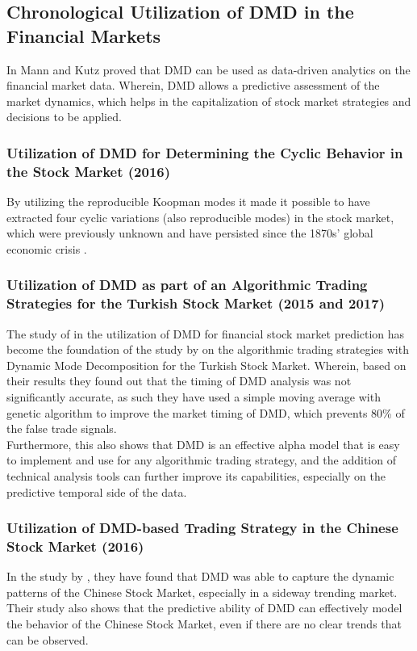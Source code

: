 \subsection{Chronological Utilization of DMD in the Financial Markets}
\label{subsec:chronological_utilization_dmd}
In \citeyear{Mann2015} Mann and Kutz proved that DMD can be used as data-driven analytics 
on the financial market data. Wherein, DMD allows a predictive assessment of 
the market dynamics, which helps in the capitalization of stock market 
strategies and decisions to be applied.

\subsubsection{Utilization of DMD for Determining the Cyclic Behavior in the Stock Market (2016)}
\label{subsubsec:dmd_cyclic_behavior}
By utilizing the reproducible Koopman modes it made it possible to have extracted 
four cyclic variations (also reproducible modes) in the stock market, which 
were previously unknown and have persisted since the 1870s’ 
global economic crisis
\cite{Hua2016,Williamson2015}.
\subsubsection{Utilization of DMD as part of an Algorithmic Trading Strategies for the Turkish Stock Market (2015 and 2017)}
\label{subsubsec:dmd_algorithmic_trading}
The study of  in the utilization of DMD for financial stock market 
prediction has become the foundation of the study by  
on the algorithmic trading strategies with Dynamic Mode Decomposition 
for the Turkish Stock Market. Wherein, based on their results they found out 
that the timing of DMD analysis was not significantly accurate, as such they 
have used a simple moving average with genetic algorithm to improve the market 
timing of DMD, which prevents 80\% of the false trade signals.
\\Furthermore, this also shows that DMD is an effective alpha 
model that is easy to implement and use for any algorithmic trading 
strategy, and the addition of technical analysis tools can further improve 
its capabilities, especially on the predictive temporal side of the data.
\subsubsection{Utilization of DMD-based Trading Strategy in the Chinese Stock Market (2016)}
\label{subsubsec:dmd_chinese_stock_market}
In the study by , they have found that DMD was able to capture the 
dynamic patterns of the Chinese Stock Market, especially in a sideway trending market.
\\Their study also shows that the predictive ability of DMD can effectively 
model the behavior of the Chinese Stock Market, even if there are no 
clear trends that can be observed.
